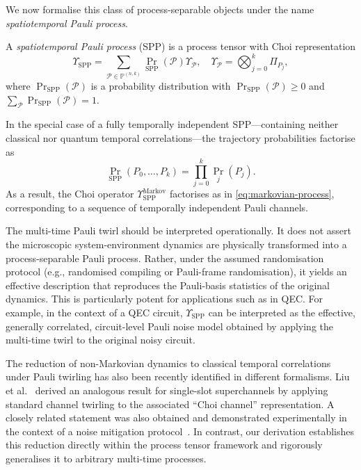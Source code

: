 We now formalise this class of process-separable objects under the name \emph{spatiotemporal Pauli process}.
\begin{definition}\label{def:def-spp}
A \emph{spatiotemporal Pauli process} (SPP) is a process tensor with Choi representation
\begin{equation}
    \Upsilon_\mathrm{SPP} = 
    \sum_{\mathcal{P}\in\mathbb{P}^{(n,k)}}
        \Pr_\mathrm{SPP}(\mathcal{P})
        \Upsilon_\mathcal{P},
        \quad
        \Upsilon_\mathcal{P} = \bigotimes_{j=0}^k\Pi_{P_j},
\end{equation}
where \(\Pr_\mathrm{SPP}(\mathcal{P})\) is a probability distribution with \(\Pr_\mathrm{SPP}(\mathcal{P}) \geq 0\) and \(\sum_{\mathcal{P}} \Pr_\mathrm{SPP}(\mathcal{P}) = 1\).
\end{definition}
In the special case of a fully temporally independent SPP---containing neither classical nor quantum temporal correlations---the trajectory probabilities factorise as
\begin{equation}
  \Pr_\mathrm{SPP}(P_0,\dots,P_k) = \prod_{j=0}^k \Pr_j(P_j).
\end{equation}
As a result, the Choi operator \(\Upsilon_\mathrm{SPP}^{\mathrm{Markov}}\) factorises as in \cref{eq:markovian-process}, corresponding to a sequence of temporally independent Pauli channels.

The multi-time Pauli twirl should be interpreted operationally. It does not assert the microscopic system-environment dynamics are physically transformed into a process-separable Pauli process. Rather, under the assumed randomisation protocol (e.g., randomised compiling or Pauli-frame randomisation), it yields an effective description that reproduces the Pauli-basis statistics of the original dynamics. This is particularly potent for applications such as in QEC. For example, in the context of a QEC circuit, \(\Upsilon_{\mathrm{SPP}}\) can be interpreted as the effective, generally correlated, circuit-level Pauli noise model obtained by applying the multi-time twirl to the original noisy circuit.

The reduction of non-Markovian dynamics to classical temporal correlations under Pauli twirling has also been recently identified in different formalisms. Liu et al.~\cite{liuNonMarkovianNoiseSuppression2024} derived an analogous result for single-slot superchannels by applying standard channel twirling to the associated ``Choi channel'' representation. A closely related statement was also obtained and demonstrated experimentally in the context of a noise mitigation protocol~\cite{liuRealizingUniversalNonMarkovian2025}. In contrast, our derivation establishes this reduction directly within the process tensor framework and rigorously generalises it to arbitrary multi-time processes.

